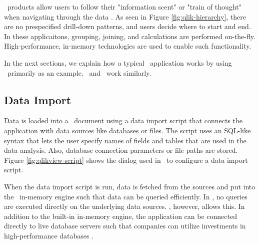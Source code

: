 
\bd~products allow users to follow their "information scent" or "train of thought" when navigating through the data \cite{Kamkolkar2015-iq, Qlik2014-vd}. As seen in Figure \ref{fig:qlik-hierarchy}, there are no prespecified drill-down patterns, and users decide where to start and end. In these applicaitons, grouping, joining, and calculations are performed on-the-fly. High-performance, in-memory technologies are used to enable such functionality. 

In the next sections, we explain how a typical \bd~application works by using \qlikview~primarily as an example. \tableau~and \powerpivot~work similarly.

\subsection{Data Import}
\label{sub:Data Import}


Data is loaded into a \qlikview~document using a data import script that connects the application with data sources like databases or files. The script uses an SQL-like syntax that lets the user specify names of fields and tables that are used in the data analysis. Also, database connection parameters or file paths are stored. Figure \ref{fig:qlikview-script} shows the dialog used in \qlikview~to configure a data import script.

When the data import script is run, data is fetched from the sources and put into the \qlikview~in-memory engine such that data can be queried efficiently. In \qlikview, no queries are executed directly on the underlying data sources. \tableau, however, allows this. In addition to the built-in in-memory engine, the application can be connected directly to live database servers such that companies can utilize investments in high-performance databases \cite{Kamkolkar2015-iq}.



